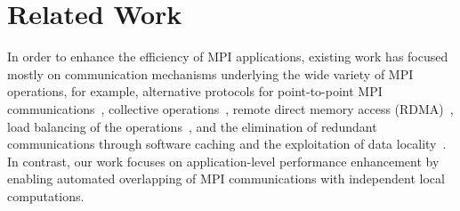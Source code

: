 
\section{Related Work}
\label{sec-related}

In order to enhance the efficiency of MPI applications, existing work has focused mostly on
communication mechanisms underlying the wide variety of MPI operations,  for example,
alternative protocols for point-to-point MPI communications~\cite{brightwell:eurompi03,denis:eurompi11},
collective operations~\cite{traff:eurompi14:ocd,traff:eurompi14:mcd,graham:eurompi08,mittal:ppopp12},
remote direct memory access (RDMA)~\cite{liu:ics03,woodall:eurompi06,hatanaka:eurompi13},
load balancing of the operations~\cite{nian:niss09,kale:eurompi14},
and the elimination of redundant communications through software caching and the exploitation of data locality~\cite{buntinas:icpp09,isujita:eurompi14,ozog:ics13}.
In contrast, our work focuses on application-level performance enhancement by enabling automated overlapping of MPI communications with independent local computations.


